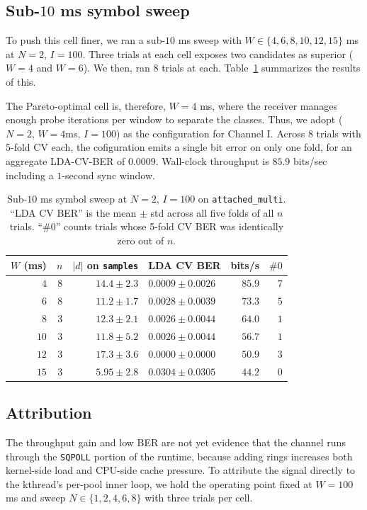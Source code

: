 \documentclass[letterpaper,twocolumn,10pt]{article}
\newcommand{\code}[1]{\texttt{#1}}
\begin{document}
\subsection{\texorpdfstring{Sub-$10$ ms symbol sweep}{Sub-10 ms symbol sweep}}
To push this cell finer, we ran a sub-$10$ ms sweep with $W \in \{4,6,8,10,12,15\}$ ms at $N=2$, $I = 100$. Three trials at each cell exposes two candidates as superior ($W = 4$ and $W = 6$). We then, ran $8$ trials at each. Table~\ref{tab:sub10} summarizes the results of this. 

The Pareto-optimal cell is, therefore, $W = 4$ ms, where the receiver manages enough probe iterations per window to separate the classes. Thus, we adopt ($N = 2$, $W = 4$ms, $I = 100$) as the configuration for Channel I. Across $8$ trials with $5$-fold CV each, the cofiguration emits a single bit error on only one fold, for an aggregate LDA-CV-BER of $0.0009$. Wall-clock throughput is $85.9$ bits/sec including a $1$-second sync window.
\begin{table}[t]
\centering\small
\caption{Sub-$10$ ms symbol sweep at $N=2$, $I=100$ on \code{attached\_multi}. ``LDA CV BER'' is the mean $\pm$ std across all five folds of all $n$ trials. ``$\#0$'' counts trials whose 5-fold CV BER was identically zero out of $n$.}
\label{tab:sub10}
\setlength{\tabcolsep}{4pt}
\begin{tabular}{rrrlrr}
\toprule
$W$ (ms) & $n$ & $|d|$ on \code{samples} & LDA CV BER & bits/s & $\#0$ \\
\midrule
$4$  & 8 & $14.4 \pm 2.3$  & $0.0009 \pm 0.0026$ & $85.9$ & $7$ \\
$6$  & 8 & $11.2 \pm 1.7$  & $0.0028 \pm 0.0039$ & $73.3$ & $5$ \\
$8$  & 3 & $12.3 \pm 2.1$  & $0.0026 \pm 0.0044$ & $64.0$ & $1$ \\
$10$ & 3 & $11.8 \pm 5.2$  & $0.0026 \pm 0.0044$ & $56.7$ & $1$ \\
$12$ & 3 & $17.3 \pm 3.6$  & $0.0000 \pm 0.0000$ & $50.9$ & $3$ \\
$15$ & 3 & $\phantom{0}5.95 \pm 2.8$ & $0.0304 \pm 0.0305$ & $44.2$ & $0$ \\
\bottomrule
\end{tabular}
\end{table}

\subsection{Attribution}
The throughput gain and low BER are not yet evidence that the channel runs through the \code{SQPOLL} portion of the runtime, because adding rings increases both kernel-side load and CPU-side cache pressure. To attribute the signal directly to the kthread's per-pool inner loop, we hold the operating point fixed at $W = 100$ms and sweep $N \in \{1,2,4,6,8\}$ with three trials per cell.
\end{document}

